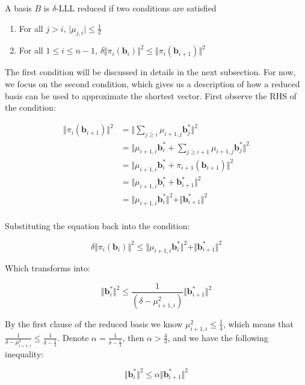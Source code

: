 \begin{definition}
    A basis $B$ is $\delta$-LLL reduced if two conditions are satisfied
    \begin{enumerate}
    \item For all $j > i$, $\vert\mu_{j, i}\vert \leq \frac{1}{2}$
    \item For all $1 \leq i \leq n-1$, $\delta\Vert \pi_i(\mathbf{b}_i)\Vert^2 \leq \Vert\pi_i(\mathbf{b}_{i+1})\Vert^2$
\end{enumerate}
\end{definition}

The first condition will be discussed in details in the next subsection. For now, we focus on the second condition, which gives us a description of how a reduced basis can be used to approximate the shortest vector. First observe the RHS of the condition:

$$
\begin{aligned}
\Vert \pi_i(\mathbf{b}_{i+1})\Vert^2 &= \Vert \sum_{j\geq i}\mu_{i+1, j}\mathbf{b}_j^\ast\Vert^2 \\
&= \Vert \mu_{i+1, i}\mathbf{b}_i^\ast + \sum_{j\geq i+1}\mu_{i+1, j}\mathbf{b}_j^\ast\Vert^2 \\
&= \Vert \mu_{i+1, i}\mathbf{b}_i^\ast + \pi_{i+1}(\mathbf{b}_{i+1}) \Vert^2 \\
&= \Vert \mu_{i+1, i}\mathbf{b}_i^\ast + \mathbf{b}_{i+1}^\ast \Vert^2 \\
&= \Vert \mu_{i+1, i}\mathbf{b}_i^\ast \Vert^2 + \Vert \mathbf{b}_{i+1}^\ast \Vert^2 \\
\end{aligned}
$$

Substituting the equation back into the condition:

$$
\delta\Vert \pi_i(\mathbf{b}_i)\Vert^2 \leq \Vert \mu_{i+1, i}\mathbf{b}_i^\ast \Vert^2 + \Vert \mathbf{b}_{i+1}^\ast \Vert^2
$$

Which transforms into:

$$
\Vert \mathbf{b}_i^\ast \Vert^2 \leq \frac{1}{(\delta - \mu_{i+1, i}^2)} \Vert \mathbf{b}_{i+1}^\ast \Vert^2
$$

By the first clause of the reduced basis we know $\mu_{i+1, i}^2 \leq \frac{1}{4}$, which means that $\frac{1}{\delta - \mu_{i+1, i}^2} \leq \frac{1}{\delta - \frac{1}{4}}$. Denote $\alpha = \frac{1}{\delta - \frac{1}{4}}$, then $\alpha > \frac{4}{3}$, and we have the following inequality:

$$
\Vert \mathbf{b}_i^\ast \Vert^2 \leq \alpha \Vert \mathbf{b}_{i+1}^\ast \Vert^2
$$

